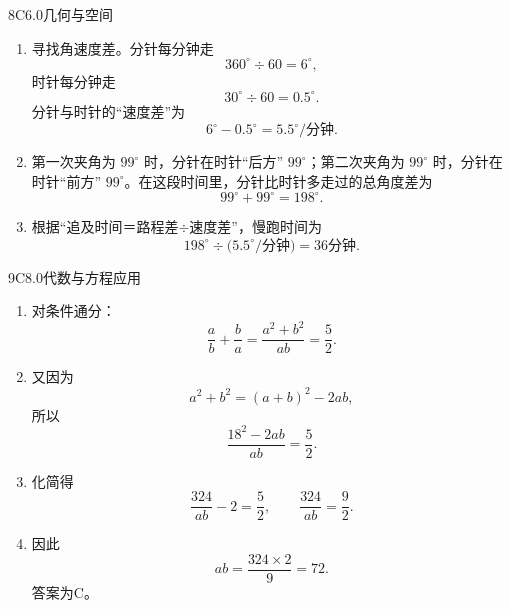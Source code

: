\begin{solution}{8}{C}{6.0}{几何与空间}
\begin{enumerate}[label=\textbf{Step \arabic*:},leftmargin=*]
  \item 寻找角速度差。分针每分钟走
  \[
    360^\circ\div60=6^\circ,
  \]
  时针每分钟走
  \[
    30^\circ\div60=0.5^\circ.
  \]
  分针与时针的“速度差”为
  \[
    6^\circ-0.5^\circ=5.5^\circ/\text{分钟}.
  \]
  \item 第一次夹角为 \(99^\circ\) 时，分针在时针“后方” \(99^\circ\)；第二次夹角为 \(99^\circ\) 时，分针在时针“前方” \(99^\circ\)。在这段时间里，分针比时针多走过的总角度差为
  \[
    99^\circ+99^\circ=198^\circ.
  \]
  \item 根据“追及时间＝路程差\(\div\)速度差”，慢跑时间为
  \[
    198^\circ\div\bigl(5.5^\circ/\text{分钟}\bigr)=36\text{分钟}.
  \]
\end{enumerate}
\end{solution}

\begin{solution}{9}{C}{8.0}{代数与方程应用}
\begin{enumerate}[label=\textbf{Step \arabic*:},leftmargin=*]
  \item 对条件通分：
  \[
    \frac ab+\frac ba=\frac{a^2+b^2}{ab}=\frac52.
  \]
  \item 又因为
  \[
    a^2+b^2=(a+b)^2-2ab,
  \]
  所以
  \[
    \frac{18^2-2ab}{ab}=\frac52.
  \]
  \item 化简得
  \[
    \frac{324}{ab}-2=\frac52,\qquad
    \frac{324}{ab}=\frac92.
  \]
  \item 因此
  \[
    ab=\frac{324\times2}{9}=72.
  \]
  答案为C。
\end{enumerate}
\end{solution}

